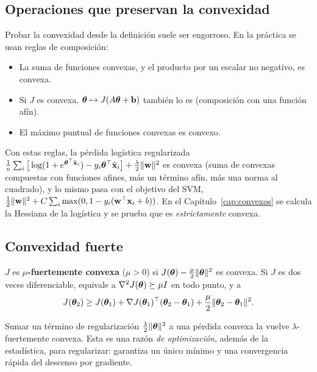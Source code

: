 \subsection{Operaciones que preservan la convexidad}

Probar la convexidad desde la definición suele ser engorroso. En la práctica se usan reglas de composición:
\begin{itemize}
  \item La suma de funciones convexas, y el producto por un escalar no negativo, es convexa.
  \item Si $J$ es convexa, $\boldsymbol{\theta} \mapsto J(A\boldsymbol{\theta} + \mathbf{b})$ también lo es (composición con una función afín).
  \item El máximo puntual de funciones convexas es convexo.
\end{itemize}
Con estas reglas, la pérdida logística regularizada
$\frac1n\sum_i \big[\log(1 + e^{\boldsymbol{\theta}^\top\tilde{\mathbf{x}}_i}) - y_i\boldsymbol{\theta}^\top\tilde{\mathbf{x}}_i\big] + \frac{\lambda}{2}\lVert\mathbf{w}\rVert^2$
es convexa (suma de convexas compuestas con funciones afines, más un término afín, más una norma al cuadrado),
y lo mismo pasa con el objetivo del SVM, $\frac12\lVert\mathbf{w}\rVert^2 + C\sum_i\max(0, 1 - y_i(\mathbf{w}^\top\mathbf{x}_i + b))$.
En el Capítulo~\ref{cap:convexos} se calcula la Hessiana de la logística y se prueba que es \emph{estrictamente}
convexa.

\subsection{Convexidad fuerte}

\begin{definicion}
$J$ es \textbf{$\mu$-fuertemente convexa} ($\mu > 0$) si $J(\boldsymbol{\theta}) - \frac{\mu}{2}\lVert\boldsymbol{\theta}\rVert^2$ es convexa.
Si $J$ es dos veces diferenciable, equivale a $\nabla^2 J(\boldsymbol{\theta}) \succeq \mu I$ en todo punto, y a
\begin{equation}
  J(\boldsymbol{\theta}_2) \ge J(\boldsymbol{\theta}_1) + \nabla J(\boldsymbol{\theta}_1)^\top(\boldsymbol{\theta}_2 - \boldsymbol{\theta}_1) + \frac{\mu}{2}\lVert\boldsymbol{\theta}_2 - \boldsymbol{\theta}_1\rVert^2.
  \label{eq:fuerte}
\end{equation}
\end{definicion}

Sumar un término de regularización $\frac{\lambda}{2}\lVert\boldsymbol{\theta}\rVert^2$ a una pérdida convexa la vuelve
$\lambda$-fuertemente convexa. Esta es una razón \emph{de optimización}, además de la estadística, para regularizar:
garantiza un único mínimo y una convergencia rápida del descenso por gradiente.

